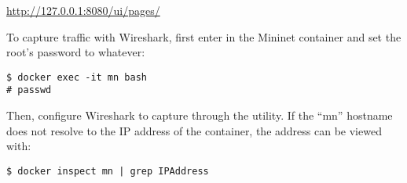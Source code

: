 \begin{center}
	\url{http://127.0.0.1:8080/ui/pages/}
\end{center}

To capture traffic with Wireshark, first enter in the Mininet container and set
the root's password to whatever:
\begin{verbatim}
$ docker exec -it mn bash
# passwd
\end{verbatim}

Then, configure Wireshark to capture through the  utility. If the
``mn'' hostname does not resolve to the IP address of the container, the address
can be viewed with:
\begin{verbatim}
$ docker inspect mn | grep IPAddress
\end{verbatim}
